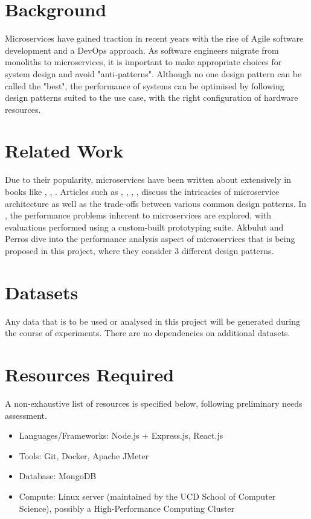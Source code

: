 \section{Background}
Microservices have gained traction in recent years with the rise of Agile software development and a DevOps \cite{awsDevOps} approach. As software engineers migrate from monoliths to microservices, it is important to make appropriate choices for system design and avoid "anti-patterns". Although no one design pattern can be called the "best", the performance of systems can be optimised by following design patterns suited to the use case, with the right configuration of hardware resources.

\section{Related Work}
Due to their popularity, microservices have been written about extensively in books like \cite{richardson18}, \cite{kleppmann17}, \cite{newman14}. Articles such as \cite{md19}, \cite{md20}, \cite{sahiti20}, \cite{udantha19}, \cite{lewis14} discuss the intricacies of microservice architecture as well as the trade-offs between various common design patterns. In \cite{cully20}, the performance problems inherent to microservices are explored, with evaluations performed using a custom-built prototyping suite. Akbulut and Perros \cite{akbulut19} dive into the performance analysis aspect of microservices that is being proposed in this project, where they consider 3 different design patterns.

\section{Datasets}
Any data that is to be used or analysed in this project will be generated during the course of experiments. There are no dependencies on additional datasets.

\section{Resources Required}

A non-exhaustive list of resources is specified below, following preliminary needs assessment.

\begin{itemize}
	\item Languages/Frameworks: Node.js + Express.js, React.js
	\item Tools: Git, Docker, Apache JMeter
	\item Database: MongoDB
	\item Compute: Linux server (maintained by the UCD School of Computer Science), possibly a High-Performance Computing Cluster
\end{itemize}

